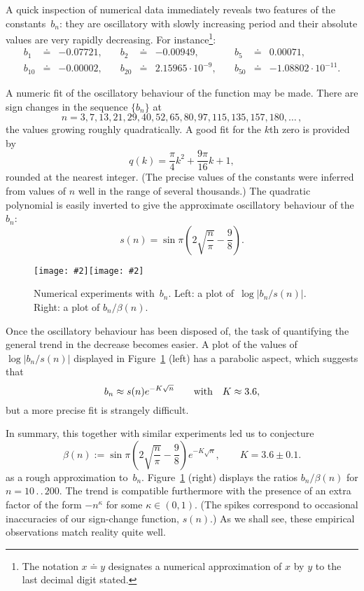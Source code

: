\documentclass{amsart}
\newcommand{\Img}[2]{\texttt{[image: \#2]}}
\begin{document}
A quick inspection of numerical data immediately reveals two features
of the constants~$b_n$: they are oscillatory with slowly increasing
period and their
absolute values are very rapidly decreasing. For instance\footnote{%
	The notation $x\doteq y$ designates a numerical approximation of
	$x$ by $y$ to the last decimal digit stated. 
}:
\[\renewcommand{\arraycolsep}{2truept}
\begin{array}{lllllllll}
b_1&\doteq&-	0.07721,\quad &
b_2&\doteq&-	0.00949,\quad &
b_5&\doteq& 	0.00071, \\
b_{10}&\doteq&-	0.00002, \quad &
b_{20}&\doteq& 	2.15965\cdot 10^{-9},\quad &
b_{50}&\doteq&-	1.08802\cdot 10^{-11}.
\end{array}\]

A numeric fit of the oscillatory behaviour of the function may be made.
There are sign changes in the sequence $\{b_n\}$ at
\[
n=3,7,13,21,29,40,52,65,80,97,115,135,157,180,\ldots\,,
\]
the values growing roughly quadratically. A good fit for the $k$th zero is
provided by
\[
q(k)= \frac{\pi}{4}k^2+\frac{9\pi}{16}k+1,\]
rounded at the  nearest integer. (The precise values of the constants were inferred from
values of $n$ well in the range of several thousands.)
The quadratic polynomial is easily 
inverted to give the approximate oscillatory behaviour of the $b_n$:
\[
s(n) = \sin\pi\left(2\sqrt{\frac{n}{\pi}}-\frac{9}{8}\right).\]

\begin{figure}

\begin{center}
\hbox{\Img{6}{exper1.jpg}\Img{6}{exper2.jpg}}
\end{center}

\caption{\label{exper-fig}
Numerical experiments with~$b_n$. Left: a plot of~$\log|b_n/s(n)|$.
Right: a plot of $b_n/\beta(n)$.}
\end{figure}
Once the oscillatory behaviour has been disposed of, the task of quantifying
the general trend in the decrease becomes easier. A plot of the values 
of $\log|b_n/s(n)|$ displayed in Figure~\ref{exper-fig} (left)
has a parabolic aspect, which suggests that
\[
b_n \approx s(n) e^{-K\sqrt{n}} \qquad \hbox{with}\quad K\approx 3.6,\]
but a more precise fit  is strangely difficult. 

In summary, this together with similar experiments led us to conjecture 
\begin{equation}\label{conj}
\beta(n):=  \sin\pi\left(2\sqrt{\frac{n}{\pi}}-\frac{9}{8}\right)  e^{-K\sqrt{n}},
\qquad K=3.6\pm 0.1.
\end{equation}
as  a   rough approximation  to~$b_n$.  Figure~\ref{exper-fig} (right)
displays the ratios $b_n/\beta(n)$  for $n=10\,.\,.\,200$.   The trend  is
compatible furthermore with the presence  of
an   extra   factor   of     the  form   $-n^\kappa$   for   some
$\kappa\in(0,1)$. (The spikes
correspond  to    occasional inaccuracies  of  our sign-change function,    $s(n)$.) 
As we shall see, these empirical observations match reality quite well.
\end{document}
